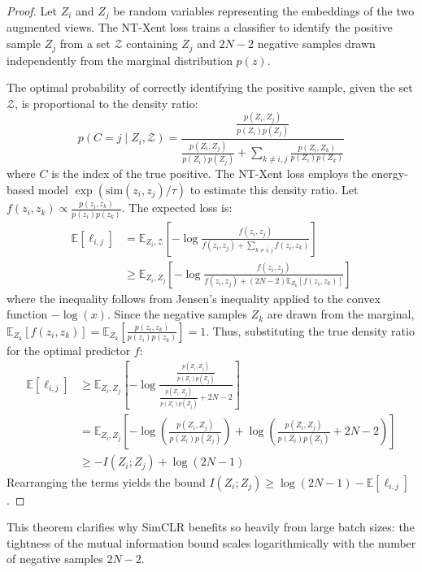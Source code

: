 \begin{proof}
Let $Z_i$ and $Z_j$ be random variables representing the embeddings of the two augmented views. The NT-Xent loss trains a classifier to identify the positive sample $Z_j$ from a set $\mathcal{Z}$ containing $Z_j$ and $2N-2$ negative samples drawn independently from the marginal distribution $p(z)$.

The optimal probability of correctly identifying the positive sample, given the set $\mathcal{Z}$, is proportional to the density ratio:
\begin{equation}
    p(C = j \mid Z_i, \mathcal{Z}) = \frac{ \frac{p(Z_i, Z_j)}{p(Z_i)p(Z_j)} }{ \frac{p(Z_i, Z_j)}{p(Z_i)p(Z_j)} + \sum_{k \neq i,j} \frac{p(Z_i, Z_k)}{p(Z_i)p(Z_k)} }
\end{equation}
where $C$ is the index of the true positive. The NT-Xent loss employs the energy-based model $\exp(\text{sim}(z_i, z_j)/\tau)$ to estimate this density ratio. Let $f(z_i, z_k) \propto \frac{p(z_i, z_k)}{p(z_i)p(z_k)}$. The expected loss is:
\begin{align*}
    \mathbb{E}[\ell_{i,j}] &= \mathbb{E}_{Z_i, \mathcal{Z}} \left[ -\log \frac{f(z_i, z_j)}{f(z_i, z_j) + \sum_{k \neq i,j} f(z_i, z_k)} \right] \\
    &\geq \mathbb{E}_{Z_i, Z_j} \left[ -\log \frac{f(z_i, z_j)}{f(z_i, z_j) + (2N-2)\mathbb{E}_{Z_k}[f(z_i, z_k)]} \right]
\end{align*}
where the inequality follows from Jensen's inequality applied to the convex function $-\log(x)$. Since the negative samples $Z_k$ are drawn from the marginal, $\mathbb{E}_{Z_k}[f(z_i, z_k)] = \mathbb{E}_{Z_k}\left[\frac{p(z_i, z_k)}{p(z_i)p(z_k)}\right] = 1$. Thus, substituting the true density ratio for the optimal predictor $f$:
\begin{align*}
    \mathbb{E}[\ell_{i,j}] &\geq \mathbb{E}_{Z_i, Z_j} \left[ -\log \frac{ \frac{p(Z_i, Z_j)}{p(Z_i)p(Z_j)} }{ \frac{p(Z_i, Z_j)}{p(Z_i)p(Z_j)} + 2N - 2 } \right] \\
    &= \mathbb{E}_{Z_i, Z_j} \left[ -\log \left( \frac{p(Z_i, Z_j)}{p(Z_i)p(Z_j)} \right) + \log \left( \frac{p(Z_i, Z_j)}{p(Z_i)p(Z_j)} + 2N - 2 \right) \right] \\
    &\geq - I(Z_i; Z_j) + \log(2N - 1)
\end{align*}
Rearranging the terms yields the bound $I(Z_i; Z_j) \geq \log(2N - 1) - \mathbb{E}[\ell_{i,j}]$.
\end{proof}

This theorem clarifies why SimCLR benefits so heavily from large batch sizes: the tightness of the mutual information bound scales logarithmically with the number of negative samples $2N-2$.

